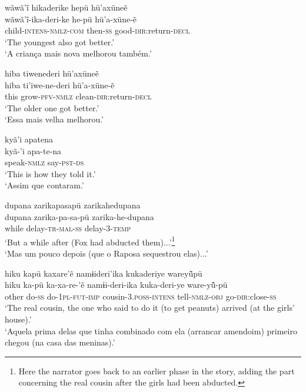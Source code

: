 \documentclass[output=paper,
modfonts,nonflat
]{langsci/langscibook}
\begin{document}
\ea   wãwã'ĩ hikaderike hepü hü'axüneẽ \\[.3em]
\gll 	wãwã'ĩ-ika-deri-ke he-pü hü'a-xüne-ẽ\\
child-\textsc{intens-nmlz-com} then-\textsc{ss} good-\textsc{dir:}return-\textsc{decl}\\
\glt    `The youngest also got better.' \\
`A criança mais nova melhorou também.'
\z

\ea    hiba tiwenederi hü'axüneẽ \\[.3em]
\gll 	hiba ti'iwe-ne-deri hü'a-xüne-ẽ \\
this grow-\textsc{pfv-nmlz} clean-\textsc{dir:}return-\textsc{decl}\\
\glt    `The older one got better.'\\
`Essa mais velha melhorou.'\\
\z

\newpage 
\ea    kyã'i apatena \\[.3em]
\gll 	kyã-'i apa-te-na\\
speak-\textsc{nmlz} say-\textsc{pst}-\textsc{ds}\\
\glt   `This is how they told it.' \\
`Assim que contaram.'\\
\z

\ea   dupana zarikapasapü zarikahedupana \\[.3em]
\gll 	dupana zarika-pa-sa-pü zarika-he-dupana\\
while delay-\textsc{tr-mal-ss} delay-3-\textsc{temp}\\
\glt    `But a while after (Fox had abducted them)...'\footnote{Here the narrator goes back to an earlier phase in the story, adding the part concerning the real cousin after the girls had been abducted.}\\
`Mas um pouco depois (que o Raposa sequestrou elas)...'
\z

\ea   hiku kapü kaxare'ẽ namɨideri'ika kukaderiye wareyü̃pü \\[.3em]
\gll 	hiku ka-pü ka-xa-re-'ẽ namɨi-deri-ika kuka-deri-ye ware-yü̃-pü\\
other do-\textsc{ss} do-\textsc{1pl-fut-imp} cousin-\textsc{3.poss-intens} tell-\textsc{nmlz}-\textsc{obj} go-\textsc{dir}:close-\textsc{ss}\\
\glt   `The real cousin, the one who said to do it (to get peanuts) arrived (at the girls' house).'  \\
`Aquela prima delas que tinha combinado com ela (arrancar amendoim) primeiro chegou (na casa das meninas).'\\
\z
\end{document}
